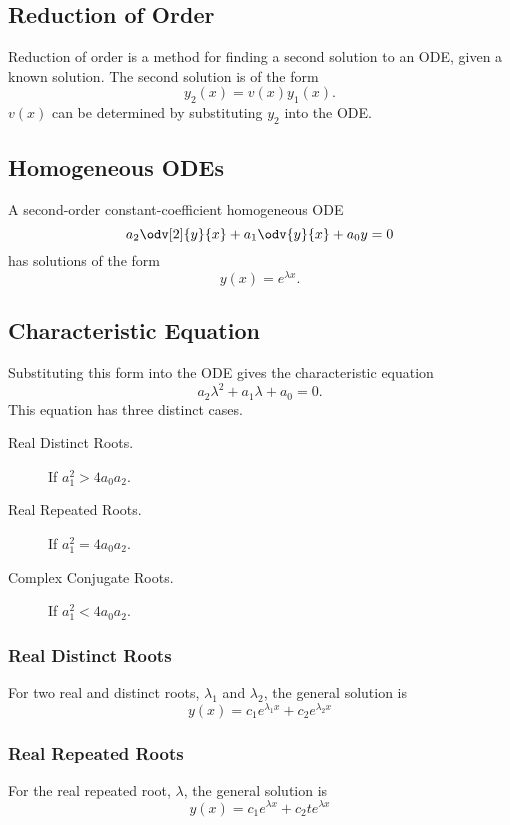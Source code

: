 \documentclass{article}
\begin{document}
\subsection{Reduction of Order}
Reduction of order is a method for finding a second solution
to an ODE, given a known solution.
The second solution is of the form
\begin{equation*}
    y_2(x) = v\left(x\right) y_1(x).
\end{equation*}
\(v(x)\) can be determined by substituting \(y_2\) into the ODE\@.
\subsection{Homogeneous ODEs}
A second-order constant-coefficient homogeneous ODE
\begin{equation*}
    a_2\odv[2]{y}{x} + a_1\odv{y}{x} + a_0y = 0
\end{equation*}
has solutions of the form
\begin{equation*}
    y(x) = e^{\lambda x}.
\end{equation*}
\subsection{Characteristic Equation}
Substituting this form into the ODE gives the characteristic equation
\begin{equation*}
    a_2\lambda^2 + a_1\lambda + a_0 = 0.
\end{equation*}
This equation has three distinct cases.
\begin{description}
    \item[Real Distinct Roots.] If \(a_1^2 > 4a_0a_2\).
    \item[Real Repeated Roots.] If \(a_1^2 = 4a_0a_2\).
    \item[Complex Conjugate Roots.] If \(a_1^2 < 4a_0a_2\).
\end{description}
\subsubsection{Real Distinct Roots}
For two real and distinct roots, \(\lambda_1\) and \(\lambda_2\), the general solution is
\begin{equation*}
    y(x) = c_1e^{\lambda_1 x} + c_2e^{\lambda_2 x}
\end{equation*}
\subsubsection{Real Repeated Roots}
For the real repeated root, \(\lambda\), the general solution is
\begin{equation*}
    y(x) = c_1e^{\lambda x} + c_2 te^{\lambda x}
\end{equation*}
\end{document}
